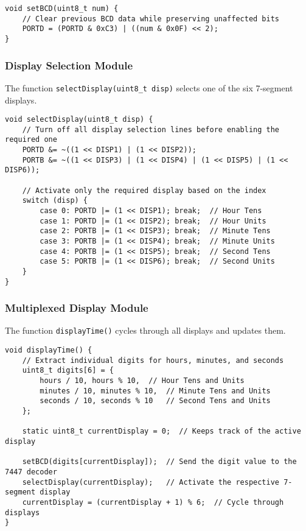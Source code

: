 \documentclass{article}
\begin{document}
\begin{lstlisting}[style=CStyle]
void setBCD(uint8_t num) {
    // Clear previous BCD data while preserving unaffected bits
    PORTD = (PORTD & 0xC3) | ((num & 0x0F) << 2);  
}
\end{lstlisting}

\subsubsection{Display Selection Module}
The function \texttt{selectDisplay(uint8\_t disp)} selects one of the six 7-segment displays.

\begin{lstlisting}[style=CStyle]
void selectDisplay(uint8_t disp) {
    // Turn off all display selection lines before enabling the required one
    PORTD &= ~((1 << DISP1) | (1 << DISP2));
    PORTB &= ~((1 << DISP3) | (1 << DISP4) | (1 << DISP5) | (1 << DISP6));

    // Activate only the required display based on the index
    switch (disp) {
        case 0: PORTD |= (1 << DISP1); break;  // Hour Tens
        case 1: PORTD |= (1 << DISP2); break;  // Hour Units
        case 2: PORTB |= (1 << DISP3); break;  // Minute Tens
        case 3: PORTB |= (1 << DISP4); break;  // Minute Units
        case 4: PORTB |= (1 << DISP5); break;  // Second Tens
        case 5: PORTB |= (1 << DISP6); break;  // Second Units
    }
}
\end{lstlisting}

\subsubsection{Multiplexed Display Module}
The function \texttt{displayTime()} cycles through all displays and updates them.

\begin{lstlisting}[style=CStyle]
void displayTime() {
    // Extract individual digits for hours, minutes, and seconds
    uint8_t digits[6] = {
        hours / 10, hours % 10,  // Hour Tens and Units
        minutes / 10, minutes % 10,  // Minute Tens and Units
        seconds / 10, seconds % 10   // Second Tens and Units
    };

    static uint8_t currentDisplay = 0;  // Keeps track of the active display
    
    setBCD(digits[currentDisplay]);  // Send the digit value to the 7447 decoder
    selectDisplay(currentDisplay);   // Activate the respective 7-segment display
    currentDisplay = (currentDisplay + 1) % 6;  // Cycle through displays
}
\end{lstlisting}
\end{document}
